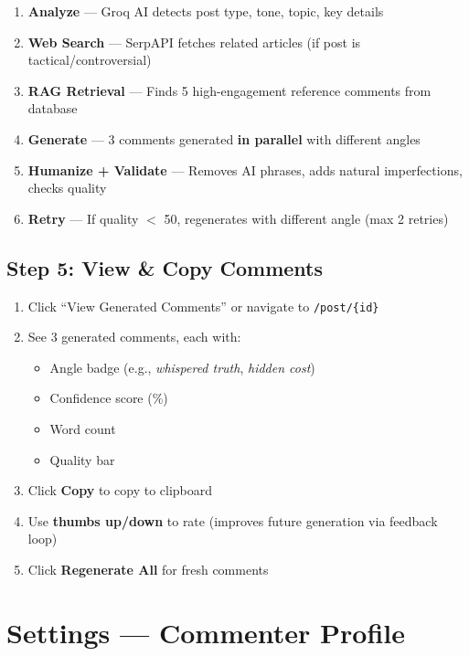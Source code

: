\documentclass[12pt,a4paper]{article}
\begin{document}
\begin{enumerate}[leftmargin=1.5em]
    \item \textbf{Analyze} --- Groq AI detects post type, tone, topic, key details
    \item \textbf{Web Search} --- SerpAPI fetches related articles (if post is tactical/controversial)
    \item \textbf{RAG Retrieval} --- Finds 5 high-engagement reference comments from database
    \item \textbf{Generate} --- 3 comments generated \textbf{in parallel} with different angles
    \item \textbf{Humanize + Validate} --- Removes AI phrases, adds natural imperfections, checks quality
    \item \textbf{Retry} --- If quality $<$ 50, regenerates with different angle (max 2 retries)
\end{enumerate}

\subsection{Step 5: View \& Copy Comments}
\begin{enumerate}[leftmargin=1.5em]
    \item Click ``View Generated Comments'' or navigate to \texttt{/post/\{id\}}
    \item See 3 generated comments, each with:
    \begin{itemize}
        \item Angle badge (e.g., \textit{whispered truth}, \textit{hidden cost})
        \item Confidence score (\%)
        \item Word count
        \item Quality bar
    \end{itemize}
    \item Click \textbf{Copy} to copy to clipboard
    \item Use \textbf{thumbs up/down} to rate (improves future generation via feedback loop)
    \item Click \textbf{Regenerate All} for fresh comments
\end{enumerate}

\section{Settings --- Commenter Profile}
\end{document}
